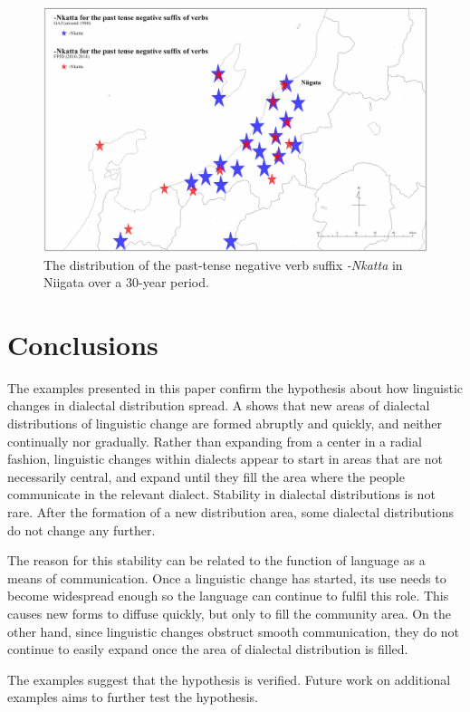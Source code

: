 \documentclass[output=paper]{LSP/langsci}
\begin{document}
\begin{figure}
\includegraphics[width=\textwidth]{illustrations/onishi_fig8}
\caption{The distribution of the past-tense negative verb suffix \textit{-Nkatta} in Niigata over a 30-year period.}
\label{fig:8}
\end{figure}

\section{Conclusions}
The examples presented in this paper confirm the hypothesis about how linguistic changes in dialectal distribution spread. A  shows that new areas of dialectal distributions of linguistic change are formed abruptly and quickly, and neither continually nor gradually. Rather than expanding from a center in a radial fashion, linguistic changes within dialects appear to start in areas that are not necessarily central, and expand until they fill the area where the people communicate in the relevant dialect. Stability in dialectal distributions is not rare. After the formation of a new distribution area, some dialectal distributions do not change any further.

The reason for this stability can be related to the function of language as a means of communication. Once a linguistic change has started, its use needs to become widespread enough so the language can continue to fulfil this role. This causes new forms to diffuse quickly, but only  to fill the community area. On the other hand, since linguistic changes obstruct smooth communication, they do not continue to easily expand once the area of dialectal distribution is filled.

The examples suggest that the hypothesis is verified. Future work on additional examples aims to further test the hypothesis.

\printbibliography[heading=subbibliography,notkeyword=this]
\end{document}
